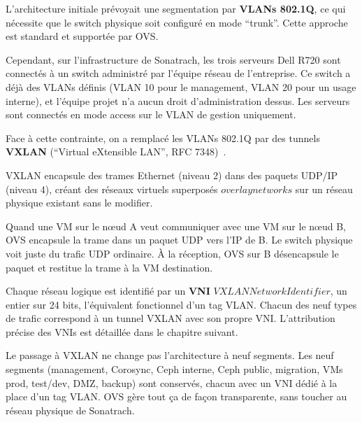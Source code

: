 \par L'architecture initiale prévoyait une segmentation par \textbf{VLANs 802.1Q}, ce qui nécessite que le switch physique soit configuré en mode ``trunk''. Cette approche est standard et supportée par OVS.\\

\par Cependant, sur l'infrastructure de Sonatrach, les trois serveurs Dell R720 sont connectés à un switch administré par l'équipe réseau de l'entreprise. Ce switch a déjà des VLANs définis (VLAN 10 pour le management, VLAN 20 pour un usage interne), et l'équipe projet n'a aucun droit d'administration dessus. Les serveurs sont connectés en mode access sur le VLAN de gestion uniquement.\\

\par Face à cette contrainte, on a remplacé les VLANs 802.1Q par des tunnels \textbf{VXLAN} (``Virtual eXtensible LAN'', RFC 7348)~\cite{refVXLAN}.\\


\par VXLAN encapsule des trames Ethernet (niveau 2) dans des paquets UDP/IP (niveau 4), créant des réseaux virtuels superposés \(overlay networks\) sur un réseau physique existant sans le modifier.\\

\par Quand une VM sur le n\oe{}ud A veut communiquer avec une VM sur le n\oe{}ud B, OVS encapsule la trame dans un paquet UDP vers l'IP de B. Le switch physique voit juste du trafic UDP ordinaire. À la réception, OVS sur B désencapsule le paquet et restitue la trame à la VM destination.\\

\par Chaque réseau logique est identifié par un \textbf{VNI} \(VXLAN Network Identifier\), un entier sur 24 bits, l'équivalent fonctionnel d'un tag VLAN. Chacun des neuf types de trafic correspond à un tunnel VXLAN avec son propre VNI. L'attribution précise des VNIs est détaillée dans le chapitre suivant.\\


\par Le passage à VXLAN ne change pas l'architecture à neuf segments. Les neuf segments (management, Corosync, Ceph interne, Ceph public, migration, VMs prod, test/dev, DMZ, backup) sont conservés, chacun avec un VNI dédié à la place d'un tag VLAN. OVS gère tout ça de façon transparente, sans toucher au réseau physique de Sonatrach.\\

